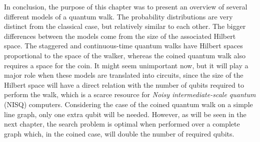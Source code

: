 \documentclass[../../dissertation.tex]{subfiles}
\begin{document}
In conclusion, the purpose of this chapter was to present an overview of
several different models of a quantum walk. The probability distributions are
very distinct from the classical case, but relatively similar to each other.
The bigger differences between the models come from the size of the associated
Hilbert space. The staggered and continuous-time quantum walks have
Hilbert spaces proportional to the space of the walker, whereas the coined
quantum walk also requires a space for the coin. It might seem unimportant now,
but it will play a major role when these models are translated into circuits,
since the size of the Hilbert space will have a direct relation with the number
of qubits required to perform the walk, which is a scarce resource for
\textit{Noisy intermediate-scale quantum} (NISQ) computers. Considering the
case of the coined quantum walk on a simple line graph, only one extra qubit
will be needed. However, as will be seen in the next chapter, the search problem is
optimal when performed over a complete graph which, in the coined case, will
double the number of required qubits. 
\end{document}
